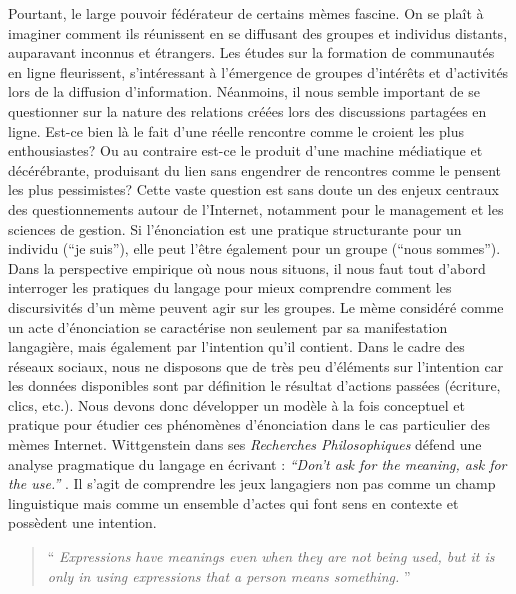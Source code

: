 Pourtant, le large pouvoir fédérateur de certains mèmes fascine. On se plaît à imaginer comment ils réunissent en se diffusant des groupes et individus distants, auparavant inconnus et étrangers. Les études sur la formation de communautés en ligne fleurissent, s'intéressant à l'émergence de groupes d{\textquoteright}intérêts et d{\textquoteright}activités lors de la diffusion d'information. Néanmoins, il nous semble important de se questionner sur la nature des relations créées lors des discussions partagées en ligne. Est-ce bien là le fait d{\textquoteright}une réelle rencontre comme le croient les plus enthousiastes? Ou au contraire est-ce le produit d{\textquoteright}une machine médiatique et décérébrante, produisant du lien sans engendrer de rencontres comme le pensent les plus pessimistes? Cette vaste question est sans doute un des enjeux centraux des questionnements autour de l{\textquoteright}Internet, notamment pour le management et les sciences de gestion. Si l{\textquoteright}énonciation est une pratique structurante pour un individu ({\textquotedblleft}je suis{\textquotedblright}), elle peut l{\textquoteright}être également pour un groupe ({\textquotedblleft}nous sommes{\textquotedblright}). Dans la perspective empirique o\`u nous nous situons, il nous faut tout d{\textquoteright}abord interroger les pratiques du langage pour mieux comprendre comment les discursivités d{\textquoteright}un mème peuvent agir sur les groupes. Le mème considéré comme un acte d{\textquoteright}énonciation se caractérise non seulement par sa manifestation langagière, mais également par l{\textquoteright}intention qu{\textquoteright}il contient. Dans le cadre des réseaux sociaux, nous ne disposons que de très peu d{\textquoteright}éléments sur l{\textquoteright}intention car les données disponibles sont par définition le résultat d{\textquoteright}actions passées (écriture, clics, etc.).\textit{ }Nous devons donc développer un modèle à la fois conceptuel et pratique pour étudier ces phénomènes d{\textquoteright}énonciation dans le cas particulier des mèmes Internet. Wittgenstein dans ses \textit{Recherches Philosophiques }défend une analyse pragmatique du langage en écrivant : \textit{{\textquotedblleft}Don{\textquoteright}t ask for the meaning, ask for the use.{\textquotedblright}} \citep{Wittgenstein2004}. Il s{\textquoteright}agit de comprendre les jeux langagiers non pas comme un champ linguistique mais comme un ensemble d{\textquoteright}actes qui font sens en contexte et possèdent une intention. 

\begin{quote}
{\textquotedblleft}
\textit{Expressions have meanings even when they are not being used, but it is only in using expressions that a person means something.}
{\textquotedblright} \citep{Bach1994}
\end{quote}

